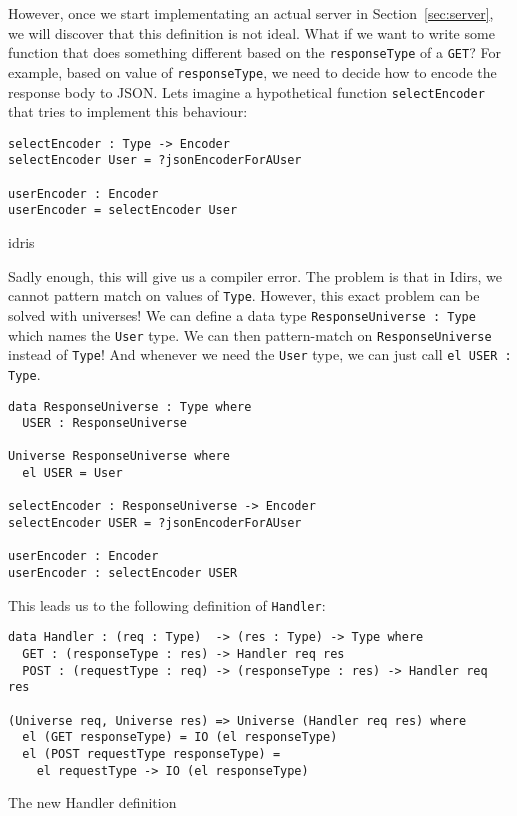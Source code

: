 \documentclass[12pt,a4paper]{article}
\begin{document}
However, once we start implementating an actual server in Section~\ref{sec:server}, we will discover that this definition is not ideal. What if we want to write some
function that does something different based on the \texttt{responseType} of a \texttt{GET}?
For example, based on value of \texttt{responseType}, we need to decide how to encode the response body to JSON. Lets imagine a hypothetical function \texttt{selectEncoder} that tries to implement this behaviour:

\begin{verbatim}
selectEncoder : Type -> Encoder
selectEncoder User = ?jsonEncoderForAUser

userEncoder : Encoder
userEncoder = selectEncoder User
\end{verbatim}{idris}

Sadly enough, this will give us a compiler error. The problem is that in Idirs, we cannot pattern match on values of \texttt{Type}. 
However, this exact problem can be solved with universes! We can define a data type \texttt{ResponseUniverse : Type} which names
the \texttt{User} type. We can then pattern-match on \texttt{ResponseUniverse} instead of \texttt{Type}!
And whenever we need the \texttt{User} type, we can just call \texttt{el USER : Type}.

\begin{verbatim}
data ResponseUniverse : Type where
  USER : ResponseUniverse

Universe ResponseUniverse where
  el USER = User

selectEncoder : ResponseUniverse -> Encoder
selectEncoder USER = ?jsonEncoderForAUser

userEncoder : Encoder
userEncoder : selectEncoder USER
\end{verbatim}

This leads us to the following definition of \texttt{Handler}:

\begin{listing}
  \begin{verbatim}
data Handler : (req : Type)  -> (res : Type) -> Type where
  GET : (responseType : res) -> Handler req res
  POST : (requestType : req) -> (responseType : res) -> Handler req res

(Universe req, Universe res) => Universe (Handler req res) where
  el (GET responseType) = IO (el responseType)
  el (POST requestType responseType) =
    el requestType -> IO (el responseType)
  \end{verbatim}
  \caption{The new Handler definition}
\end{listing}
\end{document}
